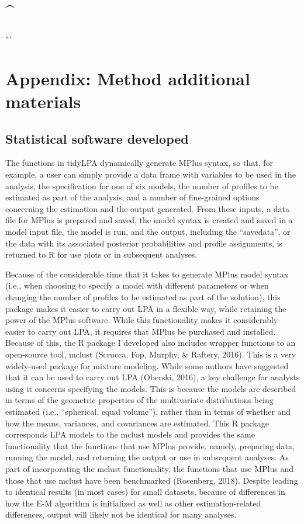 \documentclass[]{msu-thesis}
\theoremstyle{definition}
\theoremstyle{definition}
\theoremstyle{definition}
\theoremstyle{remark}
\begin{document}
\section{\^{}}\label{section}

```

\section{Appendix: Method additional
materials}\label{appendix-method-additional-materials}

\subsection{Statistical software
developed}\label{statistical-software-developed-1}

The functions in tidyLPA dynamically generate MPlus syntax, so that, for
example, a user can simply provide a data frame with variables to be
used in the analysis, the specification for one of six models, the
number of profiles to be estimated as part of the analysis, and a number
of fine-grained options concerning the estimation and the output
generated. From these inputs, a data file for MPlus is prepared and
saved, the model syntax is created and saved in a model input file, the
model is run, and the output, including the ``savedata'', or the data
with its associated posterior probabilities and profile assignments, is
returned to R for use plots or in subsequent analyses.

Because of the considerable time that it takes to generate MPlus model
syntax (i.e., when choosing to specify a model with different parameters
or when changing the number of profiles to be estimated as part of the
solution), this package makes it easier to carry out LPA in a flexible
way, while retaining the power of the MPlus software. While this
functionality makes it considerably easier to carry out LPA, it requires
that MPlus be purchased and installed. Because of this, the R package I
developed also includes wrapper functions to an open-source tool, mclust
(Scrucca, Fop, Murphy, \& Raftery, 2016). This is a very widely-used
package for mixture modeling. While some authors have suggested that it
can be used to carry out LPA (Oberski, 2016), a key challenge for
analysts using it concerns specifying the models. This is because the
models are described in terms of the geometric properties of the
multivariate distributions being estimated (i.e., ``spherical, equal
volume''), rather than in terms of whether and how the means, variances,
and covariances are estimated. This R package corresponds LPA models to
the mclust models and provides the same functionality that the functions
that use MPlus provide, namely, preparing data, running the model, and
returning the output or use in subsequent analyses. As part of
incorporating the mclust functionality, the functions that use MPlus and
those that use mclust have been benchmarked (Rosenberg, 2018). Despite
leading to identical results (in most cases) for small datasets, because
of differences in how the E-M algorithm is initialized as well as other
estimation-related differences, output will likely not be identical for
many analyses.
\end{document}
